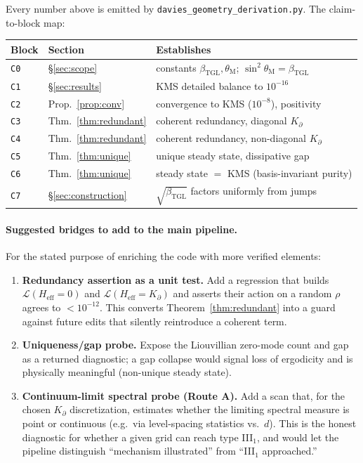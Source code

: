 \documentclass[11pt,a4paper]{article}
\theoremstyle{plain}
\theoremstyle{definition}
\newcommand{\Kp}{K_{\partial}}
\newcommand{\beTGL}{\beta_{\mathrm{TGL}}}
\newcommand{\thetaM}{\theta_{\mathrm{M}}}
\newcommand{\Heff}{H_{\mathrm{eff}}}
\newcommand{\code}[1]{\texttt{#1}}
\begin{document}
Every number above is emitted by \code{davies\_geometry\_derivation.py}. The
claim-to-block map:

\begin{center}
\begin{tabular}{@{}llp{7.4cm}@{}}
\toprule
Block & Section & Establishes \\
\midrule
\code{C0} & \S\ref{sec:scope} & constants $\beTGL,\thetaM$; $\sin^2\thetaM=\beTGL$ \\
\code{C1} & \S\ref{sec:results} & KMS detailed balance to $10^{-16}$ \\
\code{C2} & Prop.~\ref{prop:conv} & convergence to KMS ($10^{-8}$), positivity \\
\code{C3} & Thm.~\ref{thm:redundant} & coherent redundancy, diagonal $\Kp$ \\
\code{C4} & Thm.~\ref{thm:redundant} & coherent redundancy, non-diagonal $\Kp$ \\
\code{C5} & Thm.~\ref{thm:unique} & unique steady state, dissipative gap \\
\code{C6} & Thm.~\ref{thm:unique} & steady state $=$ KMS (basis-invariant purity) \\
\code{C7} & \S\ref{sec:construction} & $\sqrt{\beTGL}$ factors uniformly from jumps \\
\bottomrule
\end{tabular}
\end{center}

\paragraph{Suggested bridges to add to the main pipeline.}
For the stated purpose of enriching the code with more verified elements:
\begin{enumerate}[leftmargin=1.6em]
\item \textbf{Redundancy assertion as a unit test.} Add a regression that builds
  $\mathcal{L}(\Heff=0)$ and $\mathcal{L}(\Heff=\Kp)$ and asserts their action on
  a random $\rho$ agrees to $<10^{-12}$. This converts Theorem~\ref{thm:redundant}
  into a guard against future edits that silently reintroduce a coherent term.
\item \textbf{Uniqueness/gap probe.} Expose the Liouvillian zero-mode count and
  gap as a returned diagnostic; a gap collapse would signal loss of ergodicity
  and is physically meaningful (non-unique steady state).
\item \textbf{Continuum-limit spectral probe (Route A).} Add a scan that, for the
  chosen $\Kp$ discretization, estimates whether the limiting spectral measure is
  point or continuous (e.g.\ via level-spacing statistics vs.\ $d$). This is the
  honest diagnostic for whether a given grid can reach type III$_1$, and would
  let the pipeline distinguish ``mechanism illustrated'' from ``III$_1$
  approached.''
\end{enumerate}
\end{document}
